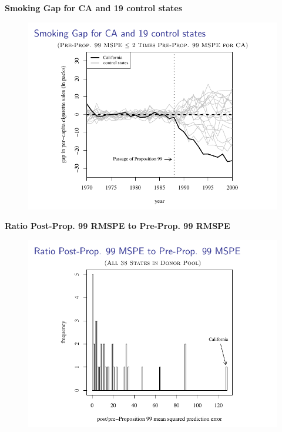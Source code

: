\documentclass[notes=show]{beamer}
\begin{document}
\begin{frame}[plain]
	\begin{center}
	\textbf{Smoking Gap for CA and 19 control states}
	\end{center}
	
	\begin{figure}
	\includegraphics[scale=0.75]{./lecture_includes/abadie_10.pdf}
	\end{figure}
\end{frame}

\begin{frame}[plain]
	\begin{center}
	\textbf{Ratio Post-Prop. 99 RMSPE to Pre-Prop. 99 RMSPE}
	\end{center}

	\begin{figure}
	\includegraphics[scale=0.75]{./lecture_includes/abadie_11.pdf}
	\end{figure}
\end{frame}
\end{document}
